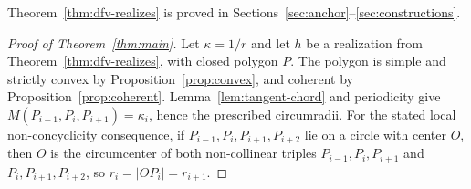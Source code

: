 Theorem~\ref{thm:dfv-realizes} is proved in
Sections~\ref{sec:anchor}--\ref{sec:constructions}.

\begin{proof}[Proof of Theorem~\ref{thm:main}]
Let $\kappa=1/r$ and let $h$ be a realization from
Theorem~\ref{thm:dfv-realizes}, with closed polygon $P$. The polygon is
simple and strictly convex by Proposition~\ref{prop:convex}, and coherent by
Proposition~\ref{prop:coherent}. Lemma~\ref{lem:tangent-chord} and periodicity
give $M(P_{i-1},P_i,P_{i+1})=\kappa_i$, hence the prescribed circumradii.
For the stated local non-concyclicity consequence, if
$P_{i-1},P_i,P_{i+1},P_{i+2}$ lie on a circle with center $O$, then $O$ is the
circumcenter of both non-collinear triples
$P_{i-1},P_i,P_{i+1}$ and $P_i,P_{i+1},P_{i+2}$, so $r_i=|OP_i|=r_{i+1}$.
\end{proof}
